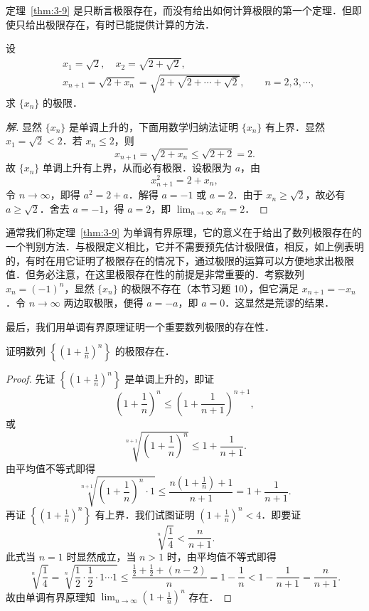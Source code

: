 定理~\ref{thm:3-9} 是只断言极限存在，而没有给出如何计算极限的第一个定理．但即使只给出极限存在，有时已能提供计算的方法．

\begin{example}\label{ex:3-2-14}
设
\[
\begin{aligned}
&x_1 = \sqrt{2},\quad x_2 = \sqrt{2+\sqrt{2}},\\
&x_{n+1} = \sqrt{2+x_n} = \sqrt{2+\sqrt{2+\cdots+\sqrt{2}}},\qquad n=2,3,\cdots,
\end{aligned}
\]
求 $\{x_n\}$ 的极限．
\end{example}

\begin{proof}[解]
显然 $\{x_n\}$ 是单调上升的，下面用数学归纳法证明 $\{x_n\}$ 有上界．显然 $x_1 = \sqrt{2} < 2$．若 $x_n \leqslant 2$，则
\[
x_{n+1} = \sqrt{2+x_n} \leqslant \sqrt{2+2} = 2.
\]
故 $\{x_n\}$ 单调上升有上界，从而必有极限．设极限为 $a$，由
\[
x_{n+1}^2 = 2 + x_n,
\]
令 $n \to \infty$，即得 $a^2 = 2 + a$．解得 $a = -1$ 或 $a = 2$．由于 $x_n \geqslant \sqrt{2}$，故必有 $a \geqslant \sqrt{2}$．舍去 $a = -1$，得 $a = 2$，即 $\lim_{n \to \infty} x_n = 2$．
\end{proof}

通常我们称定理~\ref{thm:3-9} 为单调有界原理，它的意义在于给出了数列极限存在的一个判别方法．与极限定义相比，它并不需要预先估计极限值，相反，如上例表明的，有时在用它证明了极限存在的情况下，通过极限的运算可以方便地求出极限值．但务必注意，在这里极限存在性的前提是非常重要的．考察数列 $x_n = (-1)^n$，显然 $\{x_n\}$ 的极限不存在（本节习题 10），但它满足 $x_{n+1} = -x_n$．令 $n\to\infty$ 两边取极限，便得 $a = -a$，即 $a = 0$．这显然是荒谬的结果．

最后，我们用单调有界原理证明一个重要数列极限的存在性．

\begin{example}\label{ex:3-2-15}
证明数列 $\left\{\left(1+\frac{1}{n}\right)^n\right\}$ 的极限存在．
\end{example}

\begin{proof}
先证 $\left\{\left(1+\frac{1}{n}\right)^n\right\}$ 是单调上升的，即证
\[
\left(1+\frac{1}{n}\right)^n \leqslant \left(1+\frac{1}{n+1}\right)^{n+1},
\]
或
\[
\sqrt[n+1]{\left(1+\frac{1}{n}\right)^n} \leqslant 1 + \frac{1}{n+1}.
\]
由平均值不等式即得
\[
\sqrt[n+1]{\left(1+\frac{1}{n}\right)^n\cdot 1} \leqslant \frac{n\left(1+\frac{1}{n}\right) + 1}{n+1} = 1 + \frac{1}{n+1}.
\]
再证 $\left\{\left(1+\frac{1}{n}\right)^n\right\}$ 有上界．我们试图证明 $\left(1+\frac{1}{n}\right)^n < 4$．即要证
\[
\sqrt[n]{\frac{1}{4}} < \frac{n}{n+1}.
\]
此式当 $n=1$ 时显然成立，当 $n>1$ 时，由平均值不等式即得
\[
\sqrt[n]{\frac{1}{4}} = \sqrt[n]{\frac{1}{2}\cdot\frac{1}{2}\cdot1\cdots1} \leqslant \frac{\frac{1}{2} + \frac{1}{2} + (n-2)}{n} = 1 - \frac{1}{n} < 1 - \frac{1}{n+1} = \frac{n}{n+1}.
\]
故由单调有界原理知 $\lim_{n\to\infty}\left(1+\frac{1}{n}\right)^n$ 存在．
\end{proof}

